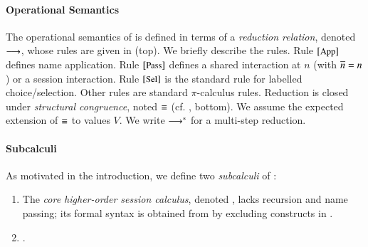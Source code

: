 \documentclass[preprint,11pt]{elsarticle}
\begin{document}
{%


\paragraph{Operational Semantics}
The  operational semantics of \HOp is defined in terms of a \emph{reduction relation}, 
denoted $\longrightarrow$, whose rules are
given in 
  (top).
 We briefly describe the rules. 
Rule ${\scriptsize{[\textrm{\small App}]}}$ defines  name application.
Rule ${\scriptsize{[\textrm{\small Pass}]}}$ defines a shared interaction at $n$ 
(with $\overline{n}=n$) or a session interaction.
Rule ${\scriptsize{[\textrm{\small Sel}]}}$ is the standard rule for labelled choice/selection. %
Other rules are standard $\pi$-calculus rules.
Reduction is closed under \emph{structural congruence}, 
noted $\equiv$ (cf. , bottom). 
We assume the expected extension of $\equiv$ to values $V$.
We write $\longrightarrow^\ast$ for a multi-step reduction.



\paragraph{Subcalculi}
As motivated in the introduction, 
we define two \emph{subcalculi} of \HOp: 
\begin{enumerate}[$\bullet$]
	\item	The  
		{\em core higher-order session calculus}, denoted \HO,
		 lacks recursion and name passing; its 
		formal syntax is obtained from  by excluding 
		constructs in .

	\item	{}.


\end{enumerate}}
\end{document}
